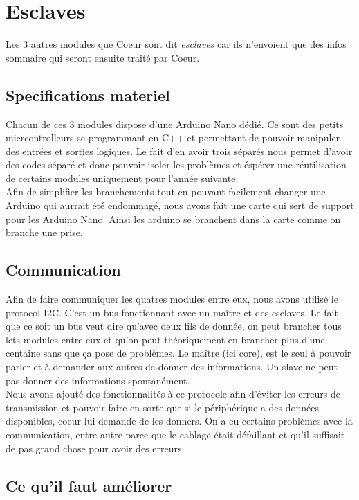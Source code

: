 \chapter{Esclaves}

Les 3 autres modules que Coeur sont dit \textit{esclaves} car ils n'envoient que des infos sommaire qui seront ensuite traité par Coeur.

\section{Specifications materiel}
Chacun de ces 3 modules dispose d'une Arduino Nano dédié. Ce sont des petits micrcontrolleurs se programmant en C++ et permettant de pouvoir manipuler des entrées et sorties logiques. Le fait d'en avoir trois séparés nous permet d'avoir des codes séparé et donc pouvoir isoler les problèmes et éspérer une réutilisation de certains modules uniquement pour l'année suivante.\\

Afin de simplifier les branchements tout en pouvant facilement changer une Arduino qui aurrait été endommagé, nous avons fait une carte qui sert de support pour les Arduino Nano. Ainsi les arduino se branchent dans la carte comme on branche une prise.

\section{Communication}
Afin de faire communiquer les quatres modules entre eux, nous avons utilisé le protocol I2C. C'est un bus fonctionnant avec un maître et des esclaves. Le fait que ce soit un bus veut dire qu'avec deux fils de donnée, on peut brancher tous lets modules entre eux et qu'on peut théoriquement en brancher plus d'une centaine sans que ça pose de problèmes. Le maître (ici core), est le seul à pouvoir parler et à demander aux autres de donner des informations. Un slave ne peut pas donner des informations spontanément.\\

Nous avons ajouté des fonctionnalités à ce protocole afin d'éviter les erreurs de transmission et pouvoir faire en sorte que si le périphérique a des données disponibles, coeur lui demande de les donners. On a eu certains problèmes avec la communication, entre autre parce que le cablage était défaillant et qu'il suffisait de pas grand chose pour avoir des erreurs.

\newpage
\section{Ce qu'il faut améliorer}
